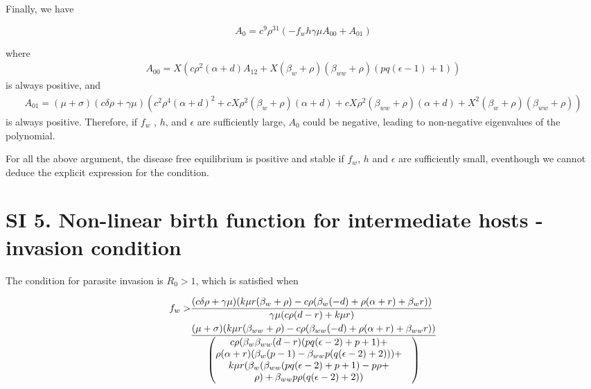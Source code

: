 \documentclass[11pt]{article}
\begin{document}
Finally, we have

\begin{equation}
	A_0 = c^9 \rho^{31} \left(-f_w h \gamma \mu A_{00} + A_{01}\right)
\end{equation}

where 
\begin{align}
	A_{00} = X (c  \rho ^2 (\alpha +d) A_{12} + X (\beta_w+\rho ) (\beta_{ww}+\rho ) ( p q (\epsilon -1)+1))
\end{align}
is always positive, and
\begin{align}
	A_{01} = (\mu +\sigma ) (c \delta  \rho +\gamma  \mu ) (c^2 \rho ^4 (\alpha +d)^2+c X \rho ^2 (\beta_w+\rho ) (\alpha +d)+c X \rho ^2 (\beta_{ww}+\rho ) (\alpha +d)+X^2 (\beta_w+\rho ) (\beta_{ww}+\rho ))
\end{align}
is always positive. Therefore, if $f_w$ , $h$, and $\epsilon$ are sufficiently large, $A_0$ could be negative, leading to non-negative eigenvalues of the polynomial.

For all the above argument, the disease free equilibrium is positive and stable if $f_w$, $h$ and $\epsilon$ are sufficiently small, eventhough we cannot deduce the explicit expression for the condition.

\section*{SI 5. Non-linear birth function for intermediate hosts - invasion condition}

The condition for parasite invasion is $R_0 > 1$, which is satisfied when

\begin{align}
	f_w > & \frac{(c \delta  \rho +\gamma  \mu ) (k \mu  r (\beta_w+\rho )-c \rho  (\beta_w (-d)+\rho  (\alpha +r)+\beta_w r))}{\gamma  \mu  (c \rho  (d-r)+k \mu  r)} \notag \\
	& \frac{(\mu +\sigma ) (k \mu  r (\beta_{ww}+\rho )-c \rho  (\beta_{ww} (-d)+\rho  (\alpha +r)+\beta_{ww} r))}{ \begin{pmatrix} c \rho  (\beta_w \beta_{ww} (d-r) (p q (\epsilon -2)+p+1) + & \\ 
			\rho  (\alpha +r) (\beta_w (p-1)-\beta_{ww} p (q (\epsilon -2)+2))) + & \\
			 k \mu  r (\beta_w (\beta_{ww} (p q (\epsilon -2)+p+1)-p \rho + & \\
			 \rho )+\beta_{ww} p \rho  (q (\epsilon -2)+2)) \end{pmatrix}}
\end{align}
\end{document}

